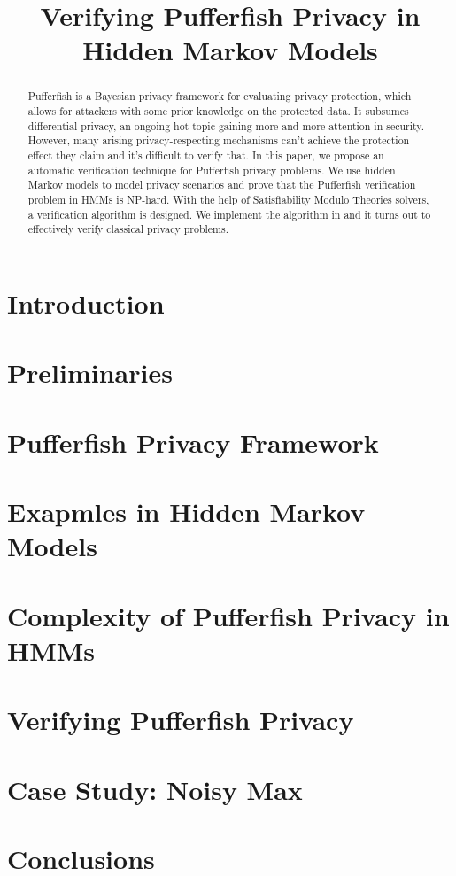 \documentclass{llncs}
\title{Verifying Pufferfish Privacy in Hidden Markov Models}
\begin{document}
\maketitle

\begin{abstract}
Pufferfish is a Bayesian privacy framework for evaluating
privacy protection, which allows for attackers with some prior knowledge
on the protected data. It subsumes differential privacy, an ongoing hot
topic gaining more and more attention in security. However, many arising privacy-respecting mechanisms can't achieve
the protection effect they claim and it's difficult to verify that. In this paper, we propose an automatic verification technique
for Pufferfish privacy problems. We use hidden Markov models to model privacy scenarios
and prove that the Pufferfish verification problem in HMMs is NP-hard.
With the help of Satisfiability Modulo Theories solvers, a verification algorithm is designed.
We implement the algorithm in \zpython and it
turns out to effectively verify classical privacy problems.
\end{abstract}

\section{Introduction}
\label{section:introduction}


\section{Preliminaries}
\label{section:preliminaries}


\section{Pufferfish Privacy Framework}
\label{section:pufferfish}


\section{Exapmles in Hidden Markov Models}
\label{section:hmm}


\section{Complexity of Pufferfish Privacy in HMMs}
\label{section:complexity}


\section{Verifying Pufferfish Privacy}
\label{section:checking-pufferfish}


\section{Case Study: Noisy Max}
\label{section:noisy-max}


\section{Conclusions}
\label{section:conclusions}




\end{document}
